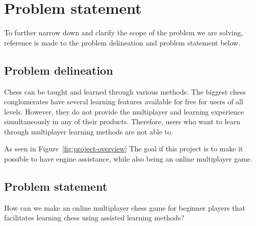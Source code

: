 \chapter{Problem statement}\label{ch:problem-statement}

To further narrow down and clarify the scope of the problem we are solving, reference is made to the problem delineation
and problem statement below.

\section{Problem delineation}\label{sec:problem-delineation}

Chess can be taught and learned through various methods.
The biggest chess conglomerates have several learning features available for free for users of all levels.
However, they do not provide the multiplayer and learning experience simultaneously in any of their products.
Therefore, users who want to learn through multiplayer learning methods are not able to.

As seen in Figure~\ref{fig:project-overview} The goal if this project is to make it possible to have engine
assistance, while also being an online multiplayer game.

\section{Problem statement}\label{sec:problem-statement}

\begin{tcolorbox}
    How can we make an online multiplayer chess game for beginner players that facilitates learning chess using
    assisted learning methods?
\end{tcolorbox}

